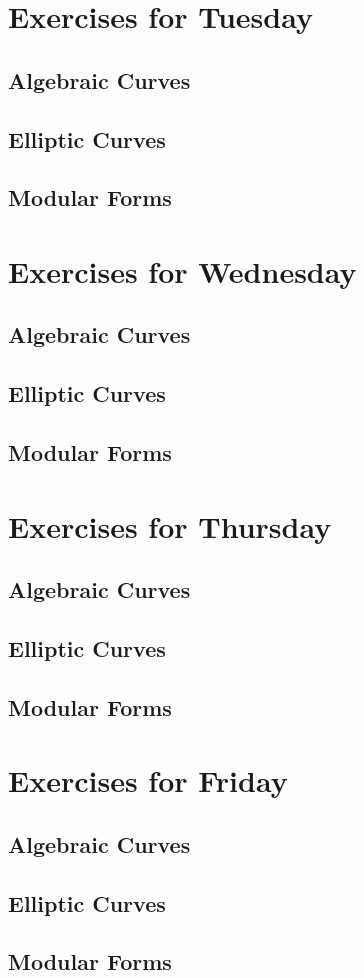 \documentclass{article}
\theoremstyle{plain} %
\theoremstyle{definition}
\theoremstyle{remark}
\numberwithin{equation}{section}
\begin{document}
\section{Exercises for Tuesday}
\subsection{Algebraic Curves}
\subsection{Elliptic Curves}
\subsection{Modular Forms}
\newpage
\maketitle

\section{Exercises for Wednesday}
\subsection{Algebraic Curves}
\subsection{Elliptic Curves}
\subsection{Modular Forms}
\newpage
\maketitle

\section{Exercises for Thursday}
\subsection{Algebraic Curves}
\subsection{Elliptic Curves}
\subsection{Modular Forms}
\newpage
\maketitle

\section{Exercises for Friday}
\subsection{Algebraic Curves}
\subsection{Elliptic Curves}
\subsection{Modular Forms}
\end{document}
